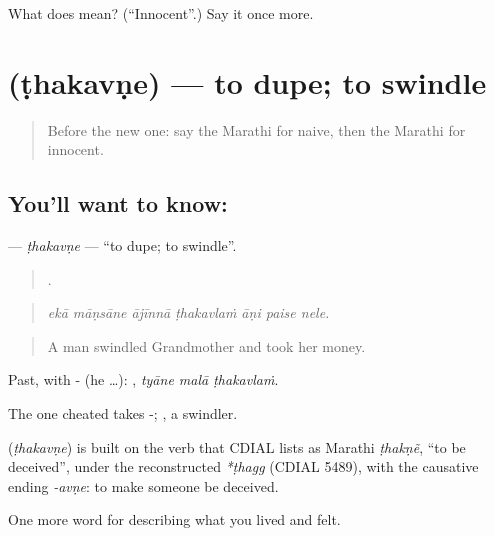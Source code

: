 \begin{tcolorbox}[breakable,colback=teal!4,colframe=teal!35!black,title={Before you move on}]
What does  mean? (\textquotedblleft{}Innocent\textquotedblright{}.) Say it once more.
\end{tcolorbox}
\section[\texorpdfstring{\mr{ठकवणे} (ṭhakavṇe)}{ठकवणे (ṭhakavṇe)}]{ (ṭhakavṇe) — to dupe; to swindle}

\label{lesson:MR-C470-thakavne}



\begin{quote}
Before the new one: say the Marathi for naive, then the Marathi for innocent.
\end{quote}

\subsection*{You'll want to know: }
\textbf{} — \emph{ṭhakavṇe} — \textquotedblleft{}to dupe; to swindle\textquotedblright{}.

\begin{quote}
      .
\end{quote}

\begin{quote}
\emph{ekā māṇsāne ājīnnā ṭhakavlaṁ āṇi paise nele.}
\end{quote}

\begin{quote}
A man swindled Grandmother and took her money.
\end{quote}

Past, with - (he …):   , \emph{tyāne malā ṭhakavlaṁ}.

The one cheated takes -; , a swindler.

\begin{cousinweb}
\textbf{} (\emph{ṭhakavṇe}) is built on the verb that CDIAL lists as Marathi \emph{ṭhakṇẽ}, \textquotedblleft{}to be deceived\textquotedblright{}, under the reconstructed \emph{*ṭhagg} (CDIAL 5489), with the causative ending \emph{-avṇe}: to make someone be deceived.
\end{cousinweb}

\begin{grammarlens}[title={What you've built}]
One more word for describing what you lived and felt.
\end{grammarlens}

